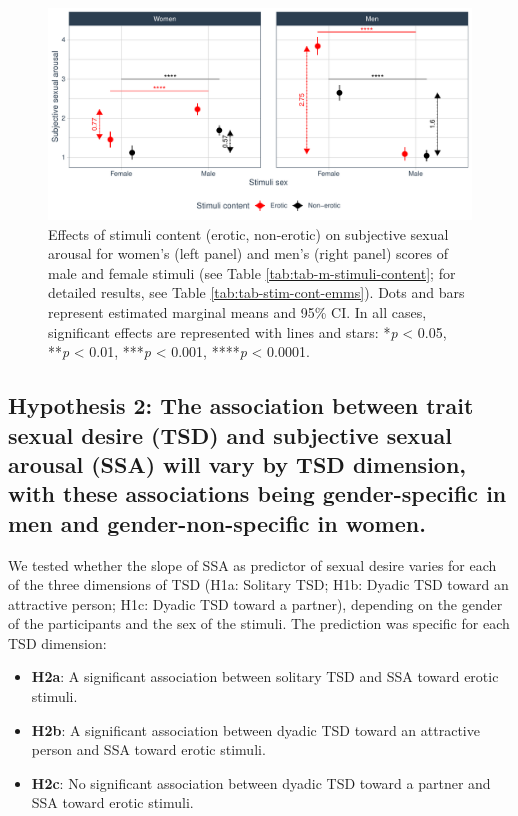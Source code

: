 \documentclass[
  bookmarksnumbered]{article}
\providecommand{\tightlist}{%
  \setlength{\itemsep}{0pt}\setlength{\parskip}{0pt}}
\begin{document}
\begin{figure}
\centering
\includegraphics{Sexual_Desire_Arousal_V2_files/figure-latex/fig-m-stimuli-content-1.pdf}
\caption{\label{fig:fig-m-stimuli-content}Effects of stimuli content (erotic, non-erotic) on subjective sexual arousal for women's (left panel) and men's (right panel) scores of male and female stimuli (see Table \ref{tab:tab-m-stimuli-content}; for detailed results, see Table \ref{tab:tab-stim-cont-emms}). Dots and bars represent estimated marginal means and 95\% CI. In all cases, significant effects are represented with lines and stars: *\emph{p} \textless{} 0.05, **\emph{p} \textless{} 0.01, ***\emph{p} \textless{} 0.001, ****\emph{p} \textless{} 0.0001.}
\end{figure}

\subsection{Hypothesis 2: The association between trait sexual desire (TSD) and subjective sexual arousal (SSA) will vary by TSD dimension, with these associations being gender-specific in men and gender-non-specific in women.}\label{hyp2}

We tested whether the slope of SSA as predictor of sexual desire varies for each of the three dimensions of TSD (H1a: Solitary TSD; H1b: Dyadic TSD toward an attractive person; H1c: Dyadic TSD toward a partner), depending on the gender of the participants and the sex of the stimuli. The prediction was specific for each TSD dimension:

\begin{itemize}
\tightlist
\item
  \textbf{H2a}: A significant association between solitary TSD and SSA toward erotic stimuli.
\item
  \textbf{H2b}: A significant association between dyadic TSD toward an attractive person and SSA toward erotic stimuli.
\item
  \textbf{H2c}: No significant association between dyadic TSD toward a partner and SSA toward erotic stimuli.
\end{itemize}
\end{document}
